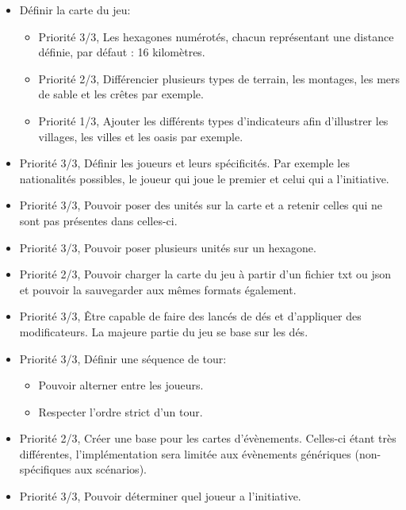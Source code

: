 \documentclass{article}[a4paper, 12pt]
\begin{document}
\begin{itemize}
    \item Définir la carte du jeu:
    \begin{itemize}
        \item Priorité 3/3, Les hexagones numérotés, chacun représentant une distance définie, par défaut : 16 kilomètres.
        \item Priorité 2/3, Différencier plusieurs types de terrain, les montages, les mers de sable et les crêtes par exemple.
        \item Priorité 1/3, Ajouter les différents types d'indicateurs afin d'illustrer les villages, les villes et les oasis par exemple.
    \end{itemize}
    \item Priorité 3/3, Définir les joueurs et leurs spécificités. Par exemple les nationalités possibles, le joueur qui joue le premier et celui qui a l'initiative.
    \item Priorité 3/3, Pouvoir poser des unités sur la carte et a retenir celles qui ne sont pas présentes dans celles-ci.
    \item Priorité 3/3, Pouvoir poser plusieurs unités sur un hexagone.
    \item Priorité 2/3, Pouvoir charger la carte du jeu à partir d'un fichier txt ou json et pouvoir la sauvegarder aux mêmes formats également.
    \item Priorité 3/3, Être capable de faire des lancés de dés et d'appliquer des modificateurs. La majeure partie du jeu se base sur les dés.
    \item Priorité 3/3, Définir une séquence de tour:
    \begin{itemize}
        \item Pouvoir alterner entre les joueurs.
        \item Respecter l'ordre strict d'un tour.
    \end{itemize}
    \item Priorité 2/3, Créer une base pour les cartes d'évènements. Celles-ci étant très différentes, l'implémentation sera limitée aux évènements génériques (non-spécifiques aux scénarios).
    \item Priorité 3/3, Pouvoir déterminer quel joueur a l'initiative.
    
\end{itemize}
\end{document}
